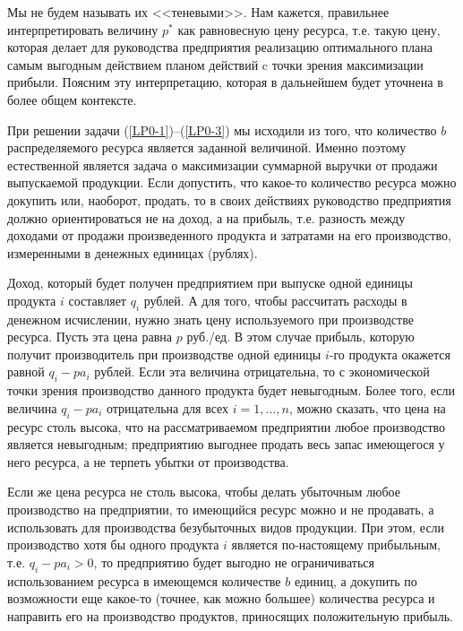     Мы не будем называть их <<теневыми>>. Нам кажется, правильнее
    интерпретировать величину $p^{*}$ как равновесную цену ресурса, т.е.
    такую цену, которая делает для руководства предприятия
    реализацию
    оптимального плана самым выгодным действием планом действий c точки
    зрения максимизации прибыли. Поясним эту
    интерпретацию, которая в дальнейшем будет уточнена в более общем
    контексте.

    При решении задачи (\ref{LP0-1})--(\ref{LP0-3}) мы исходили из
    того, что количество $b$ распределяемого ресурса является заданной
    величиной. Именно поэтому естественной является задача о
    максимизации суммарной выручки от продажи выпускаемой продукции.
    Если допустить, что какое-то количество ресурса можно докупить
    или, наоборот, продать, то в своих действиях руководство
    предприятия должно ориентироваться не на доход, а на прибыль,
    т.е. разность между доходами от продажи
    произведенного продукта и затратами на его производство,
    измеренными в денежных единицах (рублях).

    Доход, который будет получен предприятием при выпуске одной
    единицы продукта $i$ составляет $q_{i}$ рублей.
    А для того, чтобы
    рассчитать расходы в денежном исчислении, нужно знать цену
    используемого при производстве ресурса. Пусть
    эта цена равна $p$ руб./ед. В этом случае прибыль, которую
    получит производитель при производстве одной единицы $i$-го
    продукта окажется равной $q_{i}-pa_{i}$ рублей. Если эта
    величина отрицательна, то с экономической точки зрения
    производство данного продукта будет невыгодным. Более того, если
    величина $q_{i}-pa_{i}$ отрицательна для всех $i=1,\ldots,n$,
    можно сказать, что цена на ресурс столь высока, что на
    рассматриваемом предприятии любое производство является
    невыгодным; предприятию выгоднее продать весь запас имеющегося у
    него ресурса, а не терпеть убытки от производства.

    Если же цена ресурса не столь высока, чтобы делать убыточным
    любое производство на предприятии, то имеющийся ресурс можно и
    не продавать, а использовать для производства безубыточных видов
    продукции. При этом, если производство хотя бы одного продукта
    $i$ является по-настоящему прибыльным, т.е. $q_{i}-pa_{i}>0$, то
    предприятию будет выгодно не ограничиваться использованием
    ресурса в имеющемся количестве $b$ единиц, а докупить по возможности
    еще какое-то (точнее, как можно большее) количества ресурса  и направить
    его на производство продуктов, приносящих положительную прибыль.

